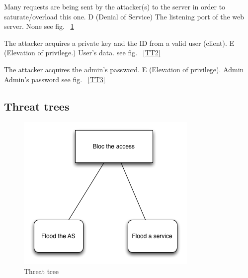 
{Many requests are being sent by the attacker(s) to the server in order to saturate/overload this one.} %
{D (Denial of Service)} %
{The listening port of the web server.} %
{None} %
{see fig. ~\ref{TT1}} %

{The attacker acquires a private key and the ID from a valid user (client).}
{E (Elevation of privilege.)}
{}
{User's data.}
{see fig. ~\ref{TT2}}

{The attacker acquires the admin's password.}
{E (Elevation of privilege).}
{Admin}
{Admin's password}
{see fig. ~\ref{TT3}}

\subsection{Threat trees}
\begin{figure}[H]
	\center
    \includegraphics[scale=0.5]{TT1.png}
    \caption{Threat tree}
    \label{TT1}
\end{figure}

